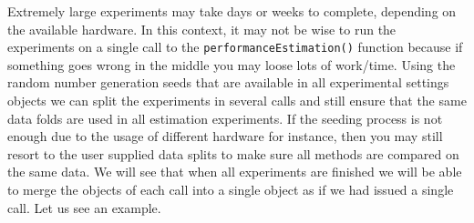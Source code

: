 \documentclass[10pt,a4paper]{article}\usepackage[]{graphicx}\usepackage[]{color}
\begin{document}
Extremely large experiments may take days or weeks to complete,
depending on the available hardware. In this context, it may not be
wise to run the experiments on a single call to the
\texttt{performanceEstimation()} function because if something goes
wrong in the middle you may loose lots of work/time. Using the random
number generation seeds that are available in all experimental
settings objects we can split the experiments in several calls and
still ensure that the same data folds are used in all
estimation experiments. If the seeding process is not enough due to the usage of different hardware for instance, then you may still resort to the user supplied data splits to make sure all methods are compared on the same data. We will see that when all experiments are
finished we will be able to merge the objects of each call into a
single object as if we had issued a single call. Let us see an
example.
\end{document}
